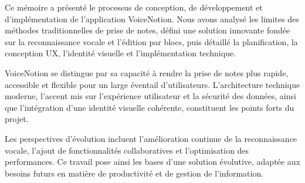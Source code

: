 
Ce mémoire a présenté le processus de conception, de développement et d’implémentation de l’application VoiceNotion. Nous avons analysé les limites des méthodes traditionnelles de prise de notes, défini une solution innovante fondée sur la reconnaissance vocale et l’édition par blocs, puis détaillé la planification, la conception UX, l’identité visuelle et l’implémentation technique.

VoiceNotion se distingue par sa capacité à rendre la prise de notes plus rapide, accessible et flexible pour un large éventail d’utilisateurs. L’architecture technique moderne, l’accent mis sur l’expérience utilisateur et la sécurité des données, ainsi que l’intégration d’une identité visuelle cohérente, constituent les points forts du projet.

Les perspectives d’évolution incluent l’amélioration continue de la reconnaissance vocale, l’ajout de fonctionnalités collaboratives et l’optimisation des performances. Ce travail pose ainsi les bases d’une solution évolutive, adaptée aux besoins futurs en matière de productivité et de gestion de l’information.
